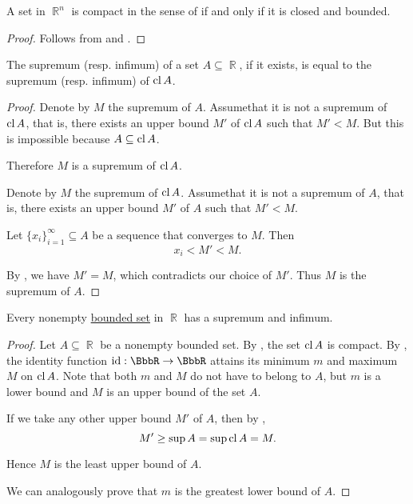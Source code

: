 \begin{theorem}\label{thm:heine_borel}
  A set in \( \BbbR^n \) is compact in the sense of  if and only if it is closed and bounded.
\end{theorem}
\begin{proof}
  Follows from  and .
\end{proof}

\begin{proposition}\label{thm:real_supremum_of_closure}
  The supremum (resp. infimum) of a set \( A \subseteq \BbbR \), if it exists, is equal to the supremum (resp. infimum) of \( \operatorname{cl} A \).
\end{proposition}
\begin{proof}
  \Sufficiency Denote by \( M \) the supremum of \( A \). Assume\LEM that it is not a supremum of \( \operatorname{cl} A \), that is, there exists an upper bound \( M' \) of \( \operatorname{cl} A \) such that \( M' < M \). But this is impossible because \( A \subseteq \operatorname{cl} A \).

  Therefore \( M \) is a supremum of \( \operatorname{cl} A \).

  \Necessity Denote by \( M \) the supremum of \( \operatorname{cl} A \). Assume\LEM that it is not a supremum of \( A \), that is, there exists an upper bound \( M' \) of \( A \) such that \( M' < M \).

  Let \( \{ x_i \}_{i=1}^\infty \subseteq A \) be a sequence that converges to \( M \). Then
  \begin{equation*}
    x_i < M' < M.
  \end{equation*}

  By , we have \( M' = M \), which contradicts our choice of \( M' \). Thus \( M \) is the supremum of \( A \).
\end{proof}

\begin{proposition}\label{thm:real_bounded_set_has_supremum}
  Every nonempty \hyperref[def:metric_space/bounded_set]{bounded set} in \( \BbbR \) has a supremum and infimum.
\end{proposition}
\begin{proof}
  Let \( A \subseteq \BbbR \) be a nonempty bounded set. By , the set \( \operatorname{cl} A \) is compact. By , the identity function \( \id: \BbbR \to \BbbR \) attains its minimum \( m \) and maximum \( M \) on \( \operatorname{cl} A \). Note that both \( m \) and \( M \) do not have to belong to \( A \), but \( m \) is a lower bound and \( M \) is an upper bound of the set \( A \).

  If we take any other upper bound \( M' \) of \( A \), then by ,
  \begin{equation*}
    M' \geq \sup A = \sup \operatorname{cl} A = M.
  \end{equation*}

  Hence \( M \) is the least upper bound of \( A \).

  We can analogously prove that \( m \) is the greatest lower bound of \( A \).
\end{proof}
